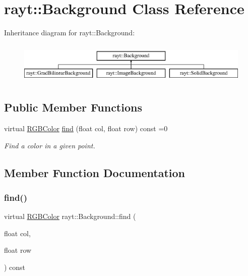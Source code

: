 \hypertarget{classrayt_1_1_background}{}\section{rayt\+::Background Class Reference}
\label{classrayt_1_1_background}
Inheritance diagram for rayt\+::Background\+:\begin{figure}[H]
\begin{center}
\leavevmode
\includegraphics[height=1.996435cm]{classrayt_1_1_background}
\end{center}
\end{figure}
\subsection*{Public Member Functions}
\begin{DoxyCompactItemize}
\item 
virtual \mbox{\hyperlink{classtao_1_1_col}{R\+G\+B\+Color}} \mbox{\hyperlink{classrayt_1_1_background_ada66e69d97dada79872cd7f79326b8cd}{find}} (float col, float row) const =0
\begin{DoxyCompactList}\small\item\em Find a color in a given point. \end{DoxyCompactList}\end{DoxyCompactItemize}


\subsection{Member Function Documentation}
\mbox{\label{classrayt_1_1_background_ada66e69d97dada79872cd7f79326b8cd}} 
\subsubsection{\texorpdfstring{find()}{find()}}
{\footnotesize\ttfamily virtual \mbox{\hyperlink{classtao_1_1_col}{R\+G\+B\+Color}} rayt\+::\+Background\+::find (\begin{DoxyParamCaption}\item[{float}]{col,  }\item[{float}]{row }\end{DoxyParamCaption}) const\hspace{0.3cm}{\ttfamily [pure virtual]}}



